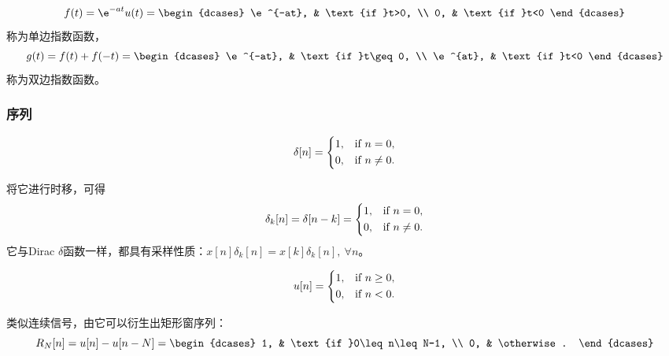 \begin{definition}[单边指数函数和双边指数函数]\label{def:exp}
    \begin{equation}
        f(t)=\e^{-at}u(t)=\begin{dcases}
            \e^{-at}, & \text{if }t>0, \\
            0,        & \text{if }t<0
        \end{dcases}
    \end{equation}
    称为单边指数函数，
    \begin{equation}
        g(t)=f(t)+f(-t)=\begin{dcases}
            \e^{-at}, & \text{if }t\geq 0, \\
            \e^{at},  & \text{if }t<0
        \end{dcases}
    \end{equation}
    称为双边指数函数。
\end{definition}

\subsubsection{序列}
\begin{definition}
    \begin{equation}
        \delta[n]=\begin{dcases}
            1, & \text{if }n=0,     \\
            0, & \text{if }n\neq 0.
        \end{dcases}
    \end{equation}
\end{definition}
将它进行时移，可得
\begin{equation}
    \delta_k[n]=\delta[n-k]=\begin{dcases}
        1, & \text{if }n=0,     \\
        0, & \text{if }n\neq 0.
    \end{dcases}
\end{equation}
它与Dirac $\delta$函数一样，都具有采样性质：$x[n]\delta_k[n]=x[k]\delta_k[n],\ \forall n$。
\begin{definition}[单位阶跃序列]
    \begin{equation}
        u[n]=\begin{dcases}
            1, & \text{if }n\geq 0, \\
            0, & \text{if }n< 0.
        \end{dcases}
    \end{equation}
\end{definition}
类似连续信号，由它可以衍生出矩形窗序列：
\begin{equation}
    R_N[n]=u[n]-u[n-N]=\begin{dcases}
        1, & \text{if }0\leq n\leq N-1, \\
        0, & \otherwise.
    \end{dcases}
\end{equation}

